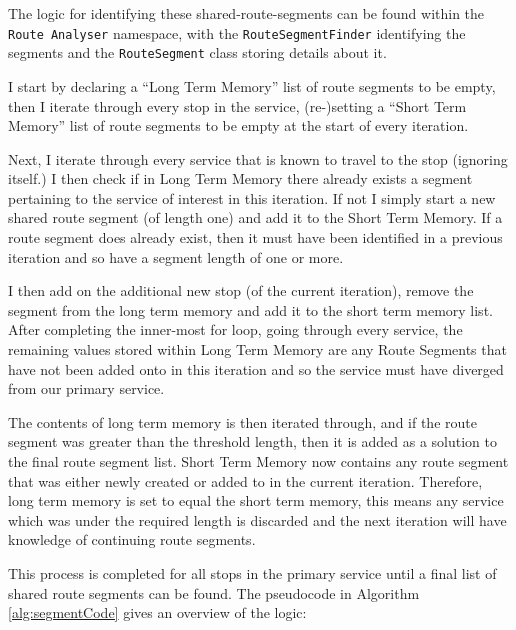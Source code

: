 \documentclass{article}
\begin{document}
\par 
The logic for identifying these shared-route-segments can be found within the \texttt{Route Analyser} namespace, with the \texttt{RouteSegmentFinder} identifying the segments and the \texttt{RouteSegment} class storing details about it. 

\par
I start by declaring a ``Long Term Memory'' list of route segments to be empty, then I iterate through every stop in the service, (re-)setting a ``Short Term Memory'' list of route segments to be empty at the start of every iteration.

\par
Next, I iterate through every service that is known to travel to the stop (ignoring itself.) I then check if in Long Term Memory there already exists a segment pertaining to the service of interest in this iteration. If not I simply start a new shared route segment (of length one) and add it to the Short Term Memory. If a route segment does already exist, then it must have been identified in a previous iteration and so have a segment length of one or more. 

\par 
I then add on the additional new stop (of the current iteration), remove the segment from the long term memory and add it to the short term memory list. After completing the inner-most for loop, going through every service, the remaining values stored within Long Term Memory are any Route Segments that have not been added onto in this iteration and so the service must have diverged from our primary service. 

\par 
The contents of long term memory is then iterated through, and if the route segment was greater than the threshold length, then it is added as a solution to the final route segment list. Short Term Memory now contains any route segment that was either newly created or added to in the current iteration. Therefore, long term memory is set to equal the short term memory, this means any service which was under the required length is discarded and the next iteration will have knowledge of continuing route segments.

\par 
This process is completed for all stops in the primary service until a final list of shared route segments can be found. The pseudocode in Algorithm \ref{alg:segmentCode} gives an overview of the logic:
\end{document}
